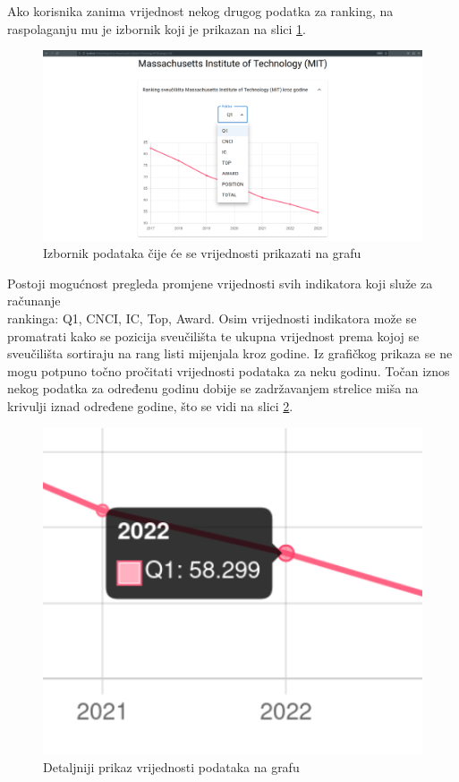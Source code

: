 \documentclass[times, utf8, zavrsni]{fer}
\begin{document}
Ako korisnika zanima vrijednost nekog drugog podatka za ranking, na raspolaganju mu je izbornik 
koji je prikazan na slici \ref{fig:unipage2}. 
\begin{figure}[htb]
    \hspace*{-2cm}  
       \includegraphics[scale=0.21]{uni2.png} 
       \caption{Izbornik podataka čije će se vrijednosti prikazati na grafu}
       \label{fig:unipage2}
       \end{figure}
Postoji mogućnost pregleda promjene vrijednosti svih indikatora koji služe za računanje \\rankinga: Q1, CNCI, IC, Top, Award. 
Osim vrijednosti indikatora može se promatrati kako se pozicija  sveučilišta te ukupna vrijednost  prema kojoj se sveučilišta 
sortiraju na rang listi mijenjala kroz godine. Iz grafičkog prikaza se ne mogu potpuno točno pročitati vrijednosti podataka za neku godinu. Točan iznos 
nekog podatka za određenu godinu dobije se zadržavanjem strelice miša na krivulji iznad određene godine, što se vidi na slici \ref{fig:detail}.
\begin{figure}[htb]
            \centering
               \includegraphics[scale=0.4]{detail.png} 
               \caption{Detaljniji prikaz vrijednosti podataka na grafu}
               \label{fig:detail}
               \end{figure}           
\end{document}
